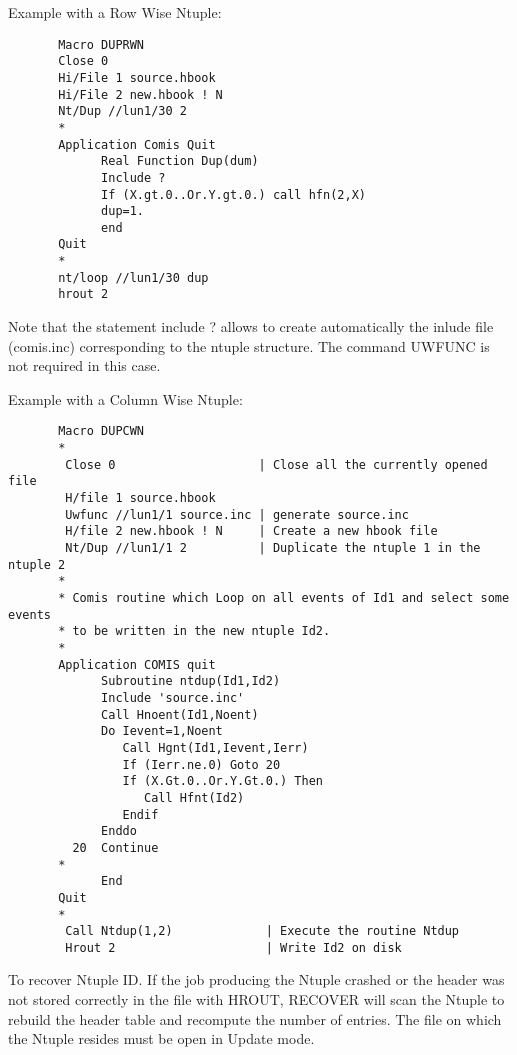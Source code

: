    \par
Example with a Row Wise Ntuple:  
\begin{verbatim}
       Macro DUPRWN
       Close 0
       Hi/File 1 source.hbook
       Hi/File 2 new.hbook ! N
       Nt/Dup //lun1/30 2
       *
       Application Comis Quit
             Real Function Dup(dum)
             Include ?
             If (X.gt.0..Or.Y.gt.0.) call hfn(2,X)
             dup=1.
             end
       Quit
       *
       nt/loop //lun1/30 dup
       hrout 2
\end{verbatim}
   \par
Note that the statement \DQUOTE{}include ?\DQUOTE{} allows to create 
   automatically the inlude file (comis.inc) corresponding to the ntuple 
   structure. The command UWFUNC is not required in this case.  

   \par
Example with a Column Wise Ntuple:  
\begin{verbatim}
       Macro DUPCWN
       *
        Close 0                    | Close all the currently opened file
        H/file 1 source.hbook
        Uwfunc //lun1/1 source.inc | generate source.inc
        H/file 2 new.hbook ! N     | Create a new hbook file
        Nt/Dup //lun1/1 2          | Duplicate the ntuple 1 in the ntuple 2
       *
       * Comis routine which Loop on all events of Id1 and select some events
       * to be written in the new ntuple Id2.
       *
       Application COMIS quit
             Subroutine ntdup(Id1,Id2)
             Include 'source.inc'
             Call Hnoent(Id1,Noent)
             Do Ievent=1,Noent
                Call Hgnt(Id1,Ievent,Ierr)
                If (Ierr.ne.0) Goto 20
                If (X.Gt.0..Or.Y.Gt.0.) Then
                   Call Hfnt(Id2)
                Endif
             Enddo
         20  Continue
       *
             End
       Quit
       *
        Call Ntdup(1,2)             | Execute the routine Ntdup
        Hrout 2                     | Write Id2 on disk
\end{verbatim}

\ENDCBIG


\BEGARG
{}
\ENDARG

   \par
To recover Ntuple ID. If the job producing the Ntuple crashed or the header 
   was not stored correctly in the file with HROUT, RECOVER will scan the 
   Ntuple to rebuild the header table and recompute the number of entries. The 
   file on which the Ntuple resides must be open in Update mode.  

